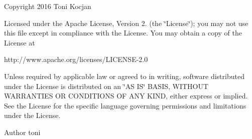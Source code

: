 Copyright 2016 Toni Kocjan

Licensed under the Apache License, Version 2. (the \char`\"{}\+License\char`\"{}); you may not use this file except in compliance with the License. You may obtain a copy of the License at \begin{DoxyVerb}http://www.apache.org/licenses/LICENSE-2.0
\end{DoxyVerb}


Unless required by applicable law or agreed to in writing, software distributed under the License is distributed on an \char`\"{}\+A\+S I\+S\char`\"{} B\+A\+S\+IS, W\+I\+T\+H\+O\+UT W\+A\+R\+R\+A\+N\+T\+I\+ES OR C\+O\+N\+D\+I\+T\+I\+O\+NS OF A\+NY K\+I\+ND, either express or implied. See the License for the specific language governing permissions and limitations under the License. \begin{DoxyAuthor}{Author}
toni 
\end{DoxyAuthor}
